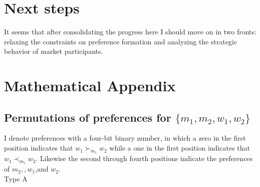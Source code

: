 \documentclass[WP]{AEA}
\newtheorem{conj}{Conjecture}
\begin{document}
\section{Next steps}
It seems that after consolidating the progress here I should move on in two fronts: relaxing the constraints on preference formation and analyzing the strategic behavior of market participants.
%
%




\appendix



\section{Mathematical Appendix}

\subsection{Permutations of preferences for $\{m_1,m_2,w_1,w_2\}$}
I denote preferences with a four-bit binary number, in which a zero in the first position indicates that $w_1\succ_{m_1} w_2$ while a one in the first position indicates that $w_1\prec_{m_1} w_2$. Likewise the second through fourth positions indicate the preferences of $m_2, ,w_1$,and $w_2$.
\\
Type A
\end{document}
